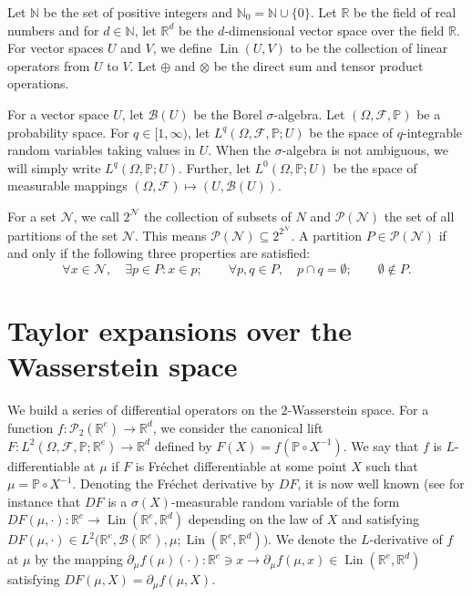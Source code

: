 \documentclass[a4paper,11pt,twoside]{article}
\numberwithin{equation}{section}
\theoremstyle{plain}
\newcommand{\bN}{\mathbb{N}}
\newcommand{\bP}{\mathbb{P}}
\newcommand{\bR}{\mathbb{R}}
\newcommand{\cB}{\mathcal{B}}
\newcommand{\cF}{\mathcal{F}}
\newcommand{\cP}{\mathcal{P}}
\newcommand{\scN}{\mathscr{N}}
\newcommand{\scP}{\mathscr{P}}
\DeclareMathOperator{\lin}{Lin}
\newcommand{\1}{\mathbbm{1}}
\begin{document}
	Let $\bN$ be the set of positive integers and $\bN_{0}=\bN \cup \{0\}$. Let $\bR$ be the field of real numbers and for $d \in \bN$, let $\bR^d$ be the $d$-dimensional vector space over the field $\bR$. For vector spaces $U$ and $V$, we define $\lin(U, V)$ to be the collection of linear operators from $U$ to $V$. Let $\oplus$ and $\otimes$ be the direct sum and tensor product operations. 
	
	For a vector space $U$, let $\cB(U)$ be the Borel $\sigma$-algebra. Let $(\Omega, \cF, \bP)$ be a probability space. For $q \in [1, \infty)$, let $L^q(\Omega, \cF, \bP; U)$ be the space of $q$-integrable random variables taking values in $U$. When the $\sigma$-algebra is not ambiguous, we will simply write $L^q(\Omega, \bP; U)$. Further, let $L^0(\Omega, \bP; U)$ be the space of measurable mappings $(\Omega, \cF) \mapsto (U, \cB(U))$. 
	
	For a set $\scN$, we call $2^\scN$ the collection of subsets of $N$ and $\scP(\scN)$ the set of all partitions of the set $\scN$. This means $\scP(\scN) \subseteq 2^{2^\scN}$. A partition $P \in \scP(\scN)$
	if and only if the following three properties are satisfied:
	$$
	\forall x \in \scN, \quad \exists p \in P: x \in p; 
	\qquad
	\forall p, q \in P, \quad p \cap q = \emptyset; 
	\qquad
	\emptyset \notin P.
	$$

	\section{Taylor expansions over the Wasserstein space}
	\label{section:TaylorExpansions}
	
	We build a series of differential operators on the $2$-Wasserstein space. For a function $f:\cP_2(\bR^e) \to \bR^d$, we consider the canonical lift $F: L^2(\Omega, \cF, \bP; \bR^e) \to \bR^d$ defined by $F(X) = f( \bP\circ X^{-1})$. We say that $f$ is $L$-differentiable at $\mu$ if $F$ is Fr\'echet differentiable at some point $X$ such that $\mu = \bP\circ X^{-1}$. Denoting the Fr\'echet derivative by $DF$, it is now well known (see for instance \cite{GangboDifferentiability2019} that $DF$ is a $\sigma(X)$-measurable random variable of the form $DF(\mu, \cdot):\bR^e \to \lin(\bR^e, \bR^d)$ depending on the law of $X$ and satisfying $DF(\mu, \cdot) \in L^2\big( \bR^e, \cB(\bR^e), \mu; \lin(\bR^e, \bR^d) \big)$. We denote the $L$-derivative of $f$ at $\mu$ by the mapping $\partial_\mu f(\mu)(\cdot): \bR^e \ni x \to \partial_\mu f(\mu, x) \in \lin(\bR^e, \bR^d)$ satisfying $DF(\mu, X) = \partial_\mu f(\mu, X)$. 
	
\end{document}
